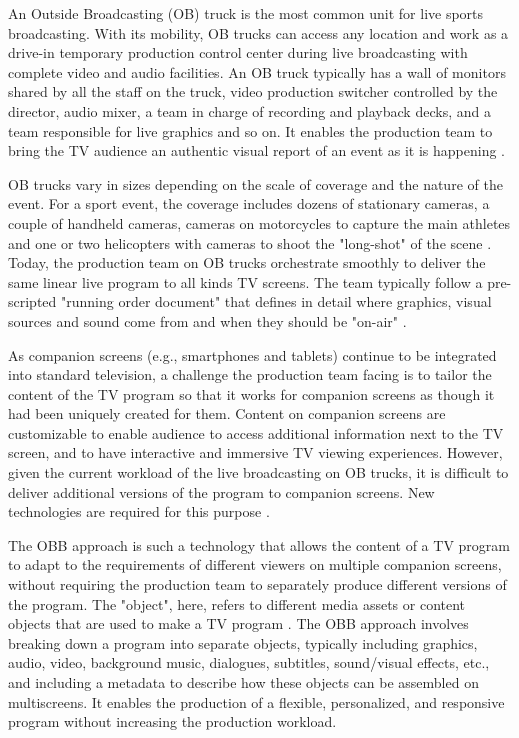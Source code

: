 \documentclass[sigchi-a, authorversion]{acmart}
\begin{document}
An Outside Broadcasting (OB) truck is the most common unit for live sports broadcasting. With its mobility, OB trucks can access any location and work as a drive-in temporary production control center during live broadcasting with complete video and audio facilities. An OB truck typically has a wall of monitors shared by all the staff on the truck, video production switcher controlled by the director, audio mixer, a team in charge of recording and playback decks, and a team responsible for live graphics and so on. It enables the production team to bring the TV audience an authentic visual report of an event as it is happening \cite{owens2012, owens2015}.

OB trucks vary in sizes depending on the scale of coverage and the nature of the event. For a sport event, the coverage includes dozens of stationary cameras, a couple of handheld cameras, cameras on motorcycles to capture the main athletes and one or two helicopters with cameras to shoot the "long-shot" of the scene \cite{owens2012, li2018}. Today, the production team on OB trucks orchestrate smoothly to deliver the same linear live program to all kinds TV screens. The team typically follow a pre-scripted "running order document" that defines in detail where graphics, visual sources and sound come from and when they should be "on-air" \cite{li2018}. 

As companion screens (e.g., smartphones and tablets) continue to be integrated into standard television, a challenge the production team facing is to tailor the content of the TV program so that it works for companion screens as though it had been uniquely created for them. Content on companion screens are customizable to enable audience to access additional information next to the TV screen, and to have interactive and immersive TV viewing experiences\cite{bentley2017, dowell2015}. However, given the current workload of the live broadcasting on OB trucks, it is difficult to deliver additional versions of the program to companion screens. New technologies are required for this purpose \cite{li2018, armstrong2014}.

The OBB approach is such a technology that allows the content of a TV program to adapt to the requirements of different viewers on multiple companion screens, without requiring the production team to separately produce different versions of the program. The "object", here, refers to different media assets or content objects that are used to make a TV program \cite{armstrong2014}. The OBB approach involves breaking down a program into separate objects, typically including graphics, audio, video, background music, dialogues, subtitles, sound/visual effects, etc., and including a metadata to describe how these objects can be assembled on multiscreens. It enables the production of a flexible, personalized, and responsive program without increasing the production workload\cite{kegel2017, williams2016}.
\end{document}
